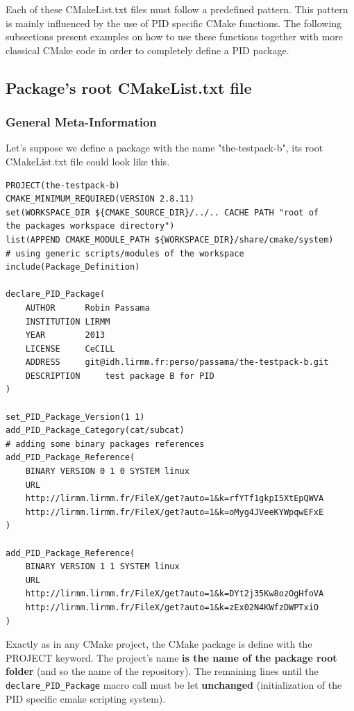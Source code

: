 \documentclass[12pt,a4paper]{article}
\begin{document}
Each of these CMakeList.txt files must follow a predefined pattern. This pattern is mainly influenced by the use of PID specific CMake functions. The following subsections present examples on how to use these functions together with more classical CMake code in order to completely define a PID package.

\subsection{Package's root CMakeList.txt file}
\label{sec:rootCMake}

\subsubsection{General Meta-Information}
\label{sec:rootCMakeGeneral}

Let's suppose we define a package with the name "the-testpack-b", its root CMakeList.txt file could look like this.

\begin{verbatim}
PROJECT(the-testpack-b)
CMAKE_MINIMUM_REQUIRED(VERSION 2.8.11)
set(WORKSPACE_DIR ${CMAKE_SOURCE_DIR}/../.. CACHE PATH "root of 
the packages workspace directory")
list(APPEND CMAKE_MODULE_PATH ${WORKSPACE_DIR}/share/cmake/system) 
# using generic scripts/modules of the workspace
include(Package_Definition)

declare_PID_Package(	
    AUTHOR      Robin Passama 
    INSTITUTION LIRMM 
    YEAR        2013 
    LICENSE     CeCILL
    ADDRESS     git@idh.lirmm.fr:perso/passama/the-testpack-b.git
    DESCRIPTION 	test package B for PID
)

set_PID_Package_Version(1 1)
add_PID_Package_Category(cat/subcat)
# adding some binary packages references
add_PID_Package_Reference(
    BINARY VERSION 0 1 0 SYSTEM linux 
    URL 	
    http://lirmm.lirmm.fr/FileX/get?auto=1&k=rfYTf1gkpI5XtEpQWVA		
    http://lirmm.lirmm.fr/FileX/get?auto=1&k=oMyg4JVeeKYWpqwEFxE
)

add_PID_Package_Reference(	
    BINARY VERSION 1 1 SYSTEM linux 
    URL 
    http://lirmm.lirmm.fr/FileX/get?auto=1&k=DYt2j35Kw8ozOgHfoVA
    http://lirmm.lirmm.fr/FileX/get?auto=1&k=zEx02N4KWfzDWPTxiO
)
\end{verbatim}

Exactly as in any CMake project, the CMake package is define with the PROJECT keyword. The project's name \textbf{is the name of the package root folder} (and so the name of the repository). The remaining lines until the \texttt{declare\_PID\_Package} macro call must be let \textbf{unchanged} (initialization of the PID specific cmake scripting system).
\end{document}
